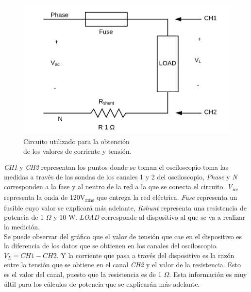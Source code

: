 \documentclass[journal]{IEEEtran}
\begin{document}
\begin{figure}[h]
\centering
\includegraphics[clip,width=0.9\columnwidth]{circuit_diagram.png}
\caption{Circuito utilizado para la obtención \\
de los valores de corriente y tensión.}
\label{circuit_diagram}
\end{figure}

\textit{CH1} y \textit{CH2} representan los puntos donde
se toman el osciloscopio toma las medidas a través de las 
sondas de los canales 1 y 2 del osciloscopio,
\textit{Phase} y \textit{N} corresponden a la fase y 
al neutro de la red a la que se conecta el circuito. 
\textit{V\textsubscript{ac}} representa 
la onda de 120V\textsubscript{rms} 
que entrega la red eléctrica. 
\textit{Fuse} representa un fusible cuyo valor se explicará 
más adelante, \textit{Rshunt} representa una resistencia 
de potencia de 1 $\Omega$ y 10 W. \textit{LOAD} corresponde
al dispositivo al que se va a realizar la
medición.\\ 

Se puede observar del
gráfico que el valor de tensión que cae en el dispositivo
es la diferencia de los datos que se obtienen en los canales 
del osciloscopio. $V_L = CH1 - CH2$. Y la corriente que 
pasa a través del dispositivo es la razón entre la tensión 
que se obtiene en el canal \textit{CH2} y el valor de la 
resistencia. Esto es el valor del canal, puesto que 
la resistencia es de 1 $\Omega$. Esta información es muy
últil para los cálculos de potencia que se explicarán más 
adelante.\\

\end{document}
